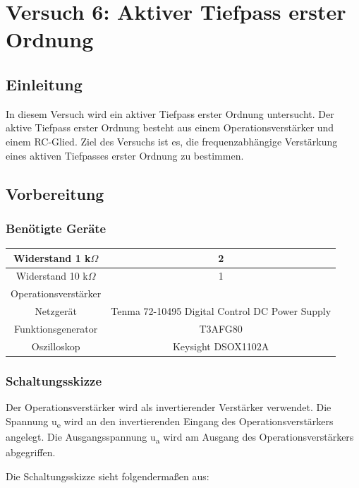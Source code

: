 \chapter{Versuch 6: Aktiver Tiefpass erster Ordnung}

\section{Einleitung}

In diesem Versuch wird ein aktiver Tiefpass erster Ordnung untersucht. 
Der aktive Tiefpass erster Ordnung besteht aus einem Operationsverstärker
und einem RC-Glied. 
Ziel des Versuchs ist es, die frequenzabhängige Verstärkung eines aktiven
Tiefpasses erster Ordnung zu bestimmen.

\section{Vorbereitung}

\subsection{Benötigte Geräte}

\begin{tabular}[h]{c|c}
    Widerstand 1 k$\Omega$ & 2\\
    \hline
    Widerstand 10 k$\Omega$ & 1\\
    \hline
    Operationsverstärker & \\
    \hline
    Netzgerät & Tenma 72-10495 Digital Control DC Power Supply\\
    \hline
    Funktionsgenerator & T3AFG80\\
    \hline
    Oszilloskop & Keysight DSOX1102A
    \label{tab:Versuch 6: Geräte}
\end{tabular}
\subsection{Schaltungsskizze}

Der Operationsverstärker wird als invertierender
Verstärker verwendet. Die Spannung u\textsubscript{e} wird an den
invertierenden Eingang des Operationsverstärkers angelegt. Die Ausgangsspannung
u\textsubscript{a} wird am Ausgang des Operationsverstärkers abgegriffen.

Die Schaltungsskizze sieht folgendermaßen aus:

